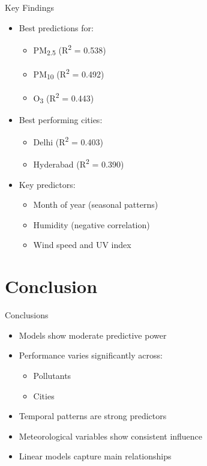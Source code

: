 \documentclass[svgnames, 10pt]{beamer}
\begin{document}
\begin{frame}{Key Findings}
\begin{itemize}
    \item Best predictions for:
        \begin{itemize}
            \item PM\textsubscript{2.5} (R\textsuperscript{2} = 0.538)
            \item PM\textsubscript{10} (R\textsuperscript{2} = 0.492)
            \item O\textsubscript{3} (R\textsuperscript{2} = 0.443)
        \end{itemize}
    \item Best performing cities:
        \begin{itemize}
            \item Delhi (R\textsuperscript{2} = 0.403)
            \item Hyderabad (R\textsuperscript{2} = 0.390)
        \end{itemize}
    \item Key predictors:
        \begin{itemize}
            \item Month of year (seasonal patterns)
            \item Humidity (negative correlation)
            \item Wind speed and UV index
        \end{itemize}
\end{itemize}
\end{frame}

\section{Conclusion}

\begin{frame}{Conclusions}
\begin{itemize}
    \item Models show moderate predictive power
    \item Performance varies significantly across:
        \begin{itemize}
            \item Pollutants
            \item Cities
        \end{itemize}
    \item Temporal patterns are strong predictors
    \item Meteorological variables show consistent influence
    \item Linear models capture main relationships
\end{itemize}
\end{frame}
\end{document}
